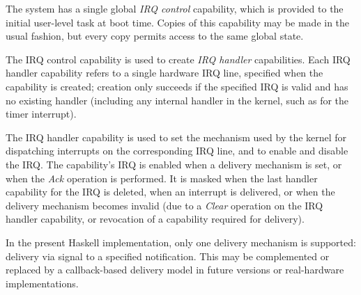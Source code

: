 The system has a single global \emph{IRQ control} capability, which is provided
to the initial user-level task at boot time. Copies of this capability may be
made in the usual fashion, but every copy permits access to the same global
state.

The IRQ control capability is used to create \emph{IRQ handler} capabilities.
Each IRQ handler capability refers to a single hardware IRQ line, specified when
the capability is created; creation only succeeds if the specified IRQ is valid
and has no existing handler (including any internal handler in the kernel, such
as for the timer interrupt).

The IRQ handler capability is used to set the mechanism used by the kernel for
dispatching interrupts on the corresponding IRQ line, and to enable and disable
the IRQ. The capability's IRQ is enabled when a delivery mechanism is set, or
when the \emph{Ack} operation is performed. It is masked when the last handler
capability for the IRQ is deleted, when an interrupt is delivered, or when the
delivery mechanism becomes invalid (due to a \emph{Clear} operation on the IRQ
handler capability, or revocation of a capability required for delivery).

In the present Haskell implementation, only one delivery mechanism is supported:
delivery via signal to a specified notification. This may be complemented
or replaced by a callback-based delivery model in future versions or
real-hardware implementations.


